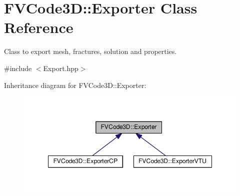 \hypertarget{classFVCode3D_1_1Exporter}{}\section{F\+V\+Code3D\+:\+:Exporter Class Reference}
\label{classFVCode3D_1_1Exporter}


Class to export mesh, fractures, solution and properties.  




{\ttfamily \#include $<$Export.\+hpp$>$}



Inheritance diagram for F\+V\+Code3D\+:\+:Exporter\+:
\nopagebreak
\begin{figure}[H]
\begin{center}
\leavevmode
\includegraphics[width=348pt]{classFVCode3D_1_1Exporter__inherit__graph}
\end{center}
\end{figure}
